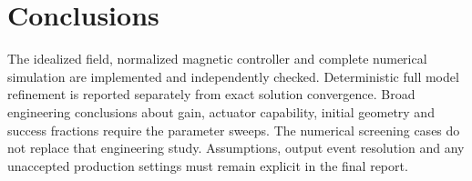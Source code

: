 \section{Conclusions}
The idealized field, normalized magnetic controller and complete numerical simulation are implemented and independently checked. Deterministic full model refinement is reported separately from exact solution convergence. Broad engineering conclusions about gain, actuator capability, initial geometry and success fractions require the parameter sweeps. The numerical screening cases do not replace that engineering study. Assumptions, output event resolution and any unaccepted production settings must remain explicit in the final report.
